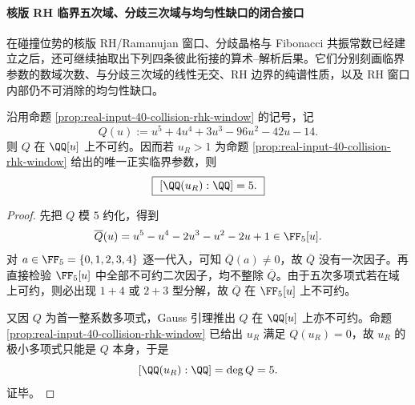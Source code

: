 \paragraph{核版 RH 临界五次域、分歧三次域与均匀性缺口的闭合接口}
在碰撞位势的核版 RH/Ramanujan 窗口、分歧晶格与 Fibonacci 共振常数已经建立之后，还可继续抽取出下列四条彼此衔接的算术--解析后果。它们分别刻画临界参数的数域次数、与分歧三次域的线性无交、RH 边界的纯谱性质，以及 RH 窗口内部仍不可消除的均匀性缺口。

\begin{theorem}[核版 RH 临界参数生成五次域]\label{thm:xi-time-part9pb-rh-critical-quintic-field}
沿用命题 \ref{prop:real-input-40-collision-rhk-window} 的记号，记
\[
Q(u):=u^5+4u^4+3u^3-96u^2-42u-14.
\]
则 \(Q\) 在 \(\QQ[u]\) 上不可约。因而若 \(u_R>1\) 为命题
\ref{prop:real-input-40-collision-rhk-window} 给出的唯一正实临界参数，则
\[
\boxed{\ [\QQ(u_R):\QQ]=5.\ }
\]
\end{theorem}
\begin{proof}
先把 \(Q\) 模 \(5\) 约化，得到
\[
\overline Q(u)=u^5-u^4-2u^3-u^2-2u+1\in \FF_5[u].
\]
对 \(a\in\FF_5=\{0,1,2,3,4\}\) 逐一代入，可知 \(\overline Q(a)\neq 0\)，故
\(\overline Q\) 没有一次因子。再直接检验 \(\FF_5[u]\) 中全部不可约二次因子，均不整除 \(\overline Q\)。由于五次多项式若在域上可约，则必出现 \(1+4\) 或 \(2+3\) 型分解，故 \(\overline Q\) 在 \(\FF_5[u]\) 上不可约。

又因 \(Q\) 为首一整系数多项式，Gauss 引理推出 \(Q\) 在 \(\QQ[u]\) 上亦不可约。命题 \ref{prop:real-input-40-collision-rhk-window} 已给出 \(u_R\) 满足 \(Q(u_R)=0\)，故 \(u_R\) 的极小多项式只能是 \(Q\) 本身，于是
\[
[\QQ(u_R):\QQ]=\deg Q=5.
\]
证毕。
\end{proof}

